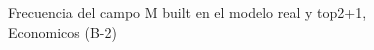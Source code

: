 \begin{figure}[H]
    \centering
    
    \caption{Frecuencia del campo M built en el modelo real y top2+1, Economicos (B-2)}
    \label{frecuency-M Built-top2+1}
\end{figure}